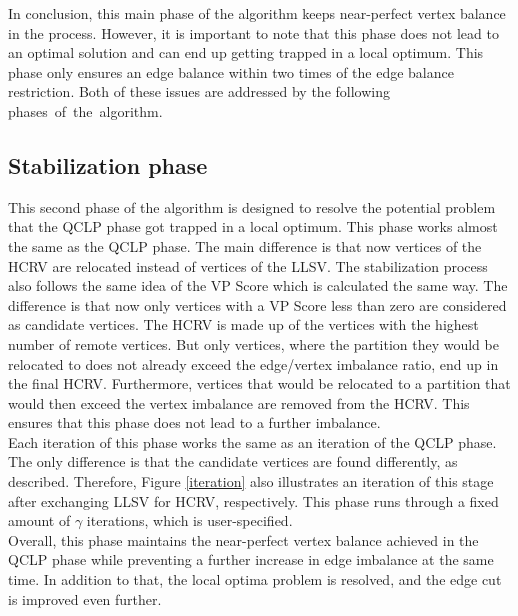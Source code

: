 \documentclass[acmsmall,nonacm,screen,review]{acmart}
\begin{document}
In conclusion, this main phase of the algorithm keeps near-perfect vertex balance in the process. However, it is important to note that this phase does not lead to an optimal solution and can end up getting trapped in a local optimum. This phase only ensures an edge balance within two times of the edge balance restriction. Both of these issues are addressed by the following \hbox{phases of the algorithm.}
\subsection{Stabilization phase}
This second phase of the algorithm is designed to resolve the potential problem that the QCLP phase got trapped in a local optimum. This phase works almost the same as the QCLP phase. The main difference is that now vertices of the HCRV are relocated instead of vertices of the LLSV. The stabilization process also follows the same idea of the VP Score which is calculated the same way. The difference is that now only vertices with a VP Score less than zero are considered as candidate vertices. The HCRV is made up of the vertices with the highest number of remote vertices. But only vertices, where the partition they would be relocated to does not already exceed the edge/vertex imbalance ratio, end up in the final HCRV. Furthermore, vertices that would be relocated to a partition that would then exceed the vertex imbalance are removed from the HCRV. This ensures that this phase does not lead to a further imbalance. \\
Each iteration of this phase works the same as an iteration of the QCLP phase. The only difference is that the candidate vertices are found differently, as described. Therefore, Figure \ref{iteration} also illustrates an iteration of this stage after exchanging LLSV for HCRV, respectively. This phase runs through a fixed amount of $\gamma$ iterations, which is user-specified. \\
Overall, this phase maintains the near-perfect vertex balance achieved in the QCLP phase while preventing a further increase in edge imbalance at the same time. In addition to that, the local optima problem is resolved, and the edge cut is improved even further.
\end{document}
